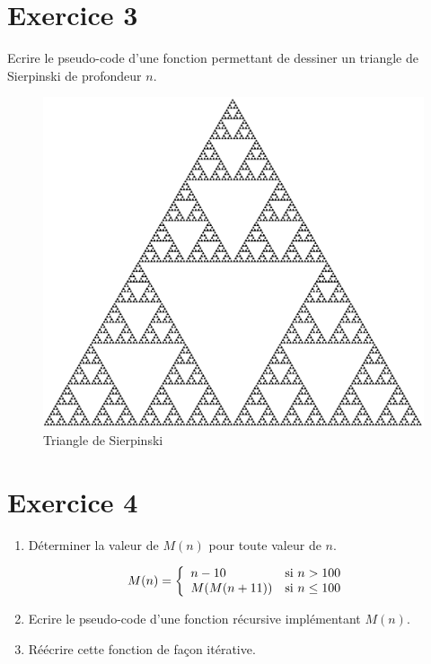 \documentclass[a4paper,10pt]{article}
\begin{document}
\section*{Exercice 3}

Ecrire le pseudo-code d'une fonction permettant de dessiner un triangle de Sierpinski de profondeur $n$.

\begin{figure}
    \center
    \includegraphics[scale=0.25]{triangle.png}
    \caption{Triangle de Sierpinski}
\end{figure}

\section*{Exercice 4}

\begin{enumerate}

\item Déterminer la valeur de $M(n)$ pour toute valeur de $n$.

\begin{align*}
M(n) &= \left\{
    \begin{array}{l l}
        n - 10 & \text{si } n > 100 \\
        M(M(n+11)) & \text{si } n \leq 100\\
    \end{array} \right.
\end{align*}

\item Ecrire le pseudo-code d'une fonction récursive implémentant $M(n)$.
\item Réécrire cette fonction de façon itérative.

\end{enumerate}
\end{document}
